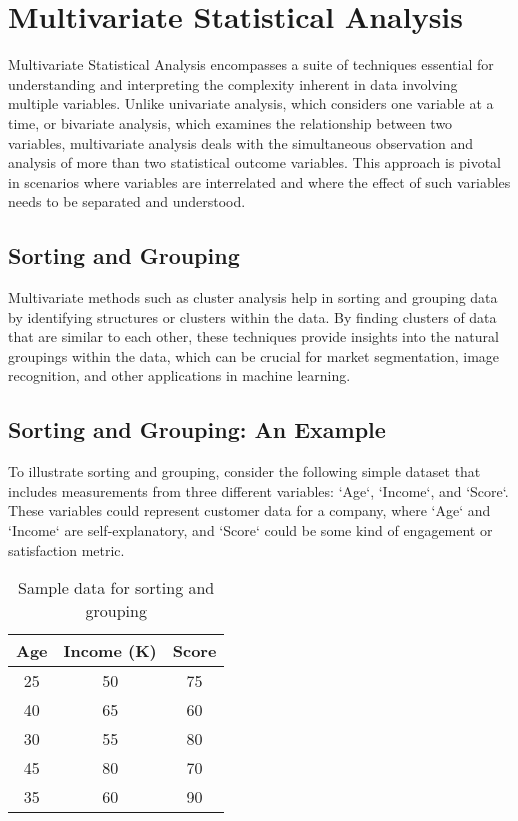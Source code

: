 \documentclass{book}
\begin{document}
\chapter{Multivariate Statistical Analysis}
\label{chap:multivariate_statistical_analysis}

Multivariate Statistical Analysis encompasses a suite of techniques essential for understanding and interpreting the complexity inherent in data involving multiple variables. Unlike univariate analysis, which considers one variable at a time, or bivariate analysis, which examines the relationship between two variables, multivariate analysis deals with the simultaneous observation and analysis of more than two statistical outcome variables. This approach is pivotal in scenarios where variables are interrelated and where the effect of such variables needs to be separated and understood.

\section{Sorting and Grouping}
Multivariate methods such as cluster analysis help in sorting and grouping data by identifying structures or clusters within the data. By finding clusters of data that are similar to each other, these techniques provide insights into the natural groupings within the data, which can be crucial for market segmentation, image recognition, and other applications in machine learning.

\section{Sorting and Grouping: An Example}
To illustrate sorting and grouping, consider the following simple dataset that includes measurements from three different variables: `Age`, `Income`, and `Score`. These variables could represent customer data for a company, where `Age` and `Income` are self-explanatory, and `Score` could be some kind of engagement or satisfaction metric.

\begin{table}[h]
\centering
\begin{tabular}{c c c}
\hline
\textbf{Age} & \textbf{Income (K)} & \textbf{Score} \\
\hline
25 & 50 & 75 \\
40 & 65 & 60 \\
30 & 55 & 80 \\
45 & 80 & 70 \\
35 & 60 & 90 \\
\hline
\end{tabular}
\caption{Sample data for sorting and grouping}
\label{tab:sample_data}
\end{table}
\end{document}
